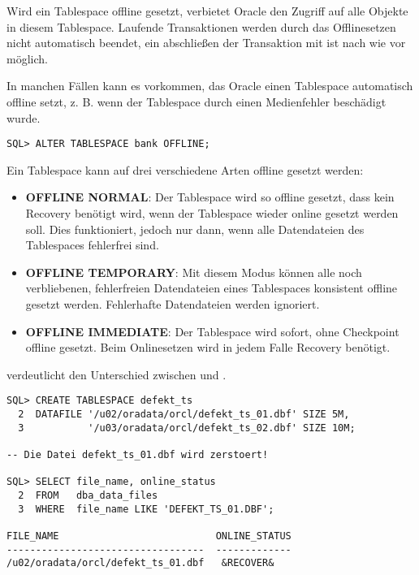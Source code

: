           Wird ein Tablespace offline gesetzt, verbietet Oracle den Zugriff auf alle Objekte in diesem Tablespace. Laufende Transaktionen werden durch das Offlinesetzen nicht automatisch beendet, ein abschließen der Transaktion mit  ist nach wie vor möglich.

          In manchen Fällen kann es vorkommen, das Oracle einen Tablespace automatisch offline setzt, z. B. wenn der Tablespace durch einen Medienfehler beschädigt wurde.
          \begin{lstlisting}[caption={Einen Tablespace offline setzen},label=admin111,language=oracle_sql]
SQL> ALTER TABLESPACE bank OFFLINE;
          \end{lstlisting}
          Ein Tablespace kann auf drei verschiedene Arten offline gesetzt werden:
          \begin{itemize}
            \item \textbf{OFFLINE NORMAL}: Der Tablespace wird so offline gesetzt, dass kein Recovery benötigt wird, wenn der Tablespace wieder online gesetzt werden soll. Dies funktioniert, jedoch nur dann, wenn alle Datendateien des Tablespaces fehlerfrei sind.
            \item \textbf{OFFLINE TEMPORARY}: Mit diesem Modus können alle noch verbliebenen, fehlerfreien Datendateien eines Tablespaces konsistent offline gesetzt werden. Fehlerhafte Datendateien werden ignoriert.
            \item \textbf{OFFLINE IMMEDIATE}: Der Tablespace wird sofort, ohne Checkpoint offline gesetzt. Beim Onlinesetzen wird in jedem Falle Recovery benötigt.
          \end{itemize}
\clearpage		  
           verdeutlicht den Unterschied zwischen  und .
          \begin{lstlisting}[caption={Der Unterschied zwischen NORMAL und TEMPORARY},label=admin112,language=oracle_sql]
SQL> CREATE TABLESPACE defekt_ts
  2  DATAFILE '/u02/oradata/orcl/defekt_ts_01.dbf' SIZE 5M,
  3           '/u03/oradata/orcl/defekt_ts_02.dbf' SIZE 10M;

-- Die Datei defekt_ts_01.dbf wird zerstoert!

SQL> SELECT file_name, online_status
  2  FROM   dba_data_files
  3  WHERE  file_name LIKE 'DEFEKT_TS_01.DBF';

FILE_NAME                           ONLINE_STATUS
----------------------------------  -------------
/u02/oradata/orcl/defekt_ts_01.dbf   &RECOVER&
          \end{lstlisting}
		  
